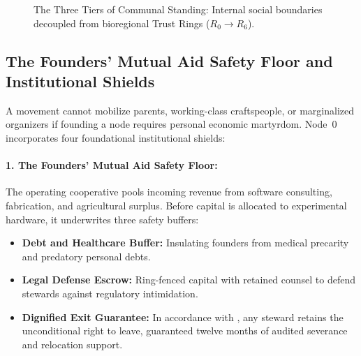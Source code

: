 \begin{figure}[htbp]
\centering
{}
\caption{The Three Tiers of Communal Standing: Internal social boundaries decoupled from bioregional Trust Rings ($R_0 \to R_6$).}
\label{fig:tricentric-topology}
\end{figure}

\subsection{The Founders' Mutual Aid Safety Floor and Institutional Shields}
\label{subsec:safety_floor_shields}


A movement cannot mobilize parents, working-class craftspeople, or marginalized organizers if founding a node requires personal economic martyrdom. Node~0 incorporates four foundational institutional shields:

\paragraph{1. The Founders' Mutual Aid Safety Floor:} The operating cooperative pools incoming revenue from software consulting, fabrication, and agricultural surplus. Before capital is allocated to experimental hardware, it underwrites three safety buffers:
\begin{itemize}
    \item \textbf{Debt and Healthcare Buffer:} Insulating founders from medical precarity and predatory personal debts.
    \item \textbf{Legal Defense Escrow:} Ring-fenced capital with retained counsel to defend stewards against regulatory intimidation.
    \item \textbf{Dignified Exit Guarantee:} In accordance with \textcite{hirschman1970}, any steward retains the unconditional right to leave, guaranteed twelve months of audited severance and relocation support.
\end{itemize}

